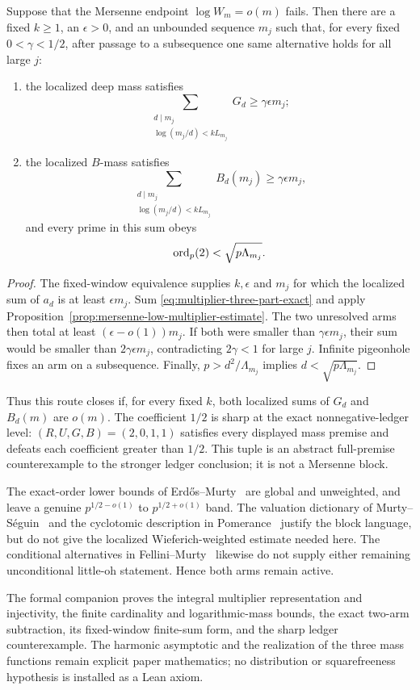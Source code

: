 \begin{theorem}
\label{thm:mersenne-multiplier-two-arm}
Suppose that the Mersenne endpoint $\log W_m=o(m)$ fails.  Then there are a
fixed $k\ge1$, an $\epsilon>0$, and an unbounded sequence $m_j$ such that,
for every fixed $0<\gamma<1/2$, after passage to a subsequence one same
alternative holds for all large $j$:
\begin{enumerate}
\item the localized deep mass satisfies
\[
 \sum_{\substack{d\mid m_j\\\log(m_j/d)<kL_{m_j}}}G_d
 \ge\gamma\epsilon m_j;
\]
\item the localized $B$-mass satisfies
\[
 \sum_{\substack{d\mid m_j\\\log(m_j/d)<kL_{m_j}}}B_d(m_j)
 \ge\gamma\epsilon m_j,
\]
and every prime in this sum obeys
\[
              \operatorname{ord}_p(2)<\sqrt{p\Lambda_{m_j}}.
\]
\end{enumerate}
\end{theorem}

\begin{proof}
The fixed-window equivalence supplies $k,\epsilon$ and $m_j$ for which the
localized sum of $a_d$ is at least $\epsilon m_j$.  Sum
\eqref{eq:multiplier-three-part-exact} and apply
Proposition~\ref{prop:mersenne-low-multiplier-estimate}.  The two unresolved
arms then total at least $(\epsilon-o(1))m_j$.  If both were smaller than
$\gamma\epsilon m_j$, their sum would be smaller than
$2\gamma\epsilon m_j$, contradicting $2\gamma<1$ for large $j$.  Infinite
pigeonhole fixes an arm on a subsequence.  Finally,
$p>d^2/\Lambda_{m_j}$ implies $d<\sqrt{p\Lambda_{m_j}}$.
\end{proof}

Thus this route closes if, for every fixed $k$, both localized sums of $G_d$
and $B_d(m)$ are $o(m)$.  The coefficient $1/2$ is sharp at the exact
nonnegative-ledger level: $(R,U,G,B)=(2,0,1,1)$ satisfies every displayed
mass premise and defeats each coefficient greater than $1/2$.  This tuple is
an abstract full-premise counterexample to the stronger ledger conclusion;
it is not a Mersenne block.

The exact-order lower bounds of Erd\H{o}s--Murty~\cite{ErdosMurty1999} are global
and unweighted, and leave a genuine $p^{1/2-o(1)}$ to $p^{1/2+o(1)}$ band.
The valuation dictionary of Murty--S\'eguin~\cite{MurtySeguin2019} and the
cyclotomic description in Pomerance~\cite{PomeranceCyclotomic2025} justify
the block language, but do not give the localized Wieferich-weighted estimate
needed here.  The conditional alternatives in
Fellini--Murty~\cite{FelliniMurty2026} likewise do not supply either remaining
unconditional little-oh statement.  Hence both arms remain active.

The formal companion proves the integral multiplier representation and
injectivity, the finite cardinality and logarithmic-mass bounds, the exact
two-arm subtraction, its fixed-window finite-sum form, and the sharp ledger
counterexample.  The harmonic asymptotic and the realization of the three
mass functions remain explicit paper mathematics; no distribution or
squarefreeness hypothesis is installed as a Lean axiom.

